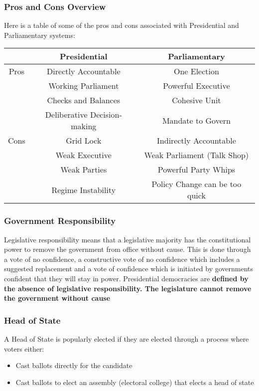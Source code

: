 \documentclass[12pt, letterpaper]{article}
\begin{document}
\subsubsection{Pros and Cons Overview}
Here is a table of some of the pros and cons associated with Presidential and Parliamentary systems:
\begin{center}
	\begin{tabular}{c|c|c}
		& Presidential & Parliamentary\\
		\hline
		Pros & Directly Accountable & One Election\\
		     & Working Parliament & Powerful Executive\\
		     & Checks and Balances & Cohesive Unit\\
		     & Deliberative Decision-making & Mandate to Govern\\
		\hline
		Cons & Grid Lock & Indirectly Accountable\\
		     & Weak Executive & Weak Parliament (Talk Shop)\\
		     & Weak Parties & Powerful Party Whips\\
		     & Regime Instability & Policy Change can be too quick
	\end{tabular}
\end{center}



\subsubsection{Government Responsibility}
Legislative responsibility means that a legislative majority has the constitutional power to remove the government from office without cause. This is done through a vote of no confidence, a constructive vote of no confidence which includes a suggested replacement and a vote of confidence which is initiated by governments confident that they will stay in power.
Presidential democracies are \textbf{defined by the absence of legislative responsibility. The legislature cannot remove the government without cause}

\subsubsection{Head of State}
A Head of State is popularly elected if they are elected through a process where voters either:
\begin{itemize}
	\item Cast ballots directly for the candidate
	\item Cast ballots to elect an assembly (electoral college) that elects a head of state
\end{itemize}
\end{document}
